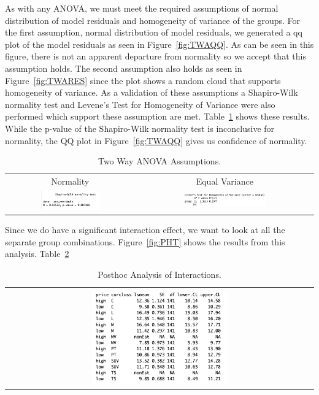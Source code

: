 \documentclass[acmsmall]{acmart}
\begin{document}
As with any ANOVA, we must meet the required assumptions of normal distribution of model residuals and homogeneity of variance of the groups. For the first assumption, normal distribution of model residuals, we generated a qq plot of the model residuals as seen in Figure~\ref{fig:TWAQQ}. As can be seen in this figure, there is not an apparent departure from normality so we accept that this assumption holds. The second assumption also holds as seen in Figure~\ref{fig:TWARES} since the plot shows a random cloud that supports homogeneity of variance. As a validation of these assumptions a Shapiro-Wilk normality test and Levene's Test for Homogeneity of Variance were also performed which support these assumption are met. Table~\ref{fig:TWAASS} shows these results. While the p-value of the Shapiro-Wilk normality test is inconclusive for normality, the QQ plot in Figure~\ref{fig:TWAQQ} gives us confidence of normality.
\begin{table}[h]
\centering
\begin{tabular}{p{} p{}}
	\hline
	\multicolumn{1}{|c|}{Normality} & \multicolumn{1}{|c|}{Equal Variance} \\
		\multicolumn{1}{|c|}{\includegraphics[width=0.48\textwidth]{../graphics/TWAshap}} &
		\multicolumn{1}{|c|}{\includegraphics[width=0.48\textwidth]{../graphics/TWALev}}\\
		\hline
	\end{tabular}		
	\caption{Two Way ANOVA Assumptions.} %
	\label{fig:TWAASS}
\end{table}
 Since we do have a significant interaction effect, we want to look at all the separate group combinations. Figure~\ref{fig:PHT} shows the results from this analysis. Table~\ref{fig:TWALS}
 \begin{table}[h]
\centering
\begin{tabular}{p{}}
	\hline
	\multicolumn{1}{|c|}{}\\
		\multicolumn{1}{|c|}{\includegraphics[width=0.45\textwidth]{../graphics/TWAls}}\\
		\hline
	\end{tabular}		
	\caption{Posthoc Analysis of Interactions.} %
	\label{fig:TWALS}
\end{table}
\end{document}
